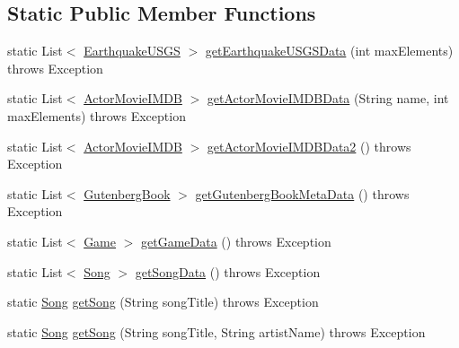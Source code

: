 \subsection*{Static Public Member Functions}
\begin{DoxyCompactItemize}
\item 
static List$<$ \mbox{\hyperlink{classbridges_1_1data__src__dependent_1_1_earthquake_u_s_g_s}{Earthquake\+U\+S\+GS}} $>$ \mbox{\hyperlink{classbridges_1_1connect_1_1_bridges_a58bef23cd12872c6ae5d7358b7485a2b}{get\+Earthquake\+U\+S\+G\+S\+Data}} (int max\+Elements)  throws Exception 
\item 
static List$<$ \mbox{\hyperlink{classbridges_1_1data__src__dependent_1_1_actor_movie_i_m_d_b}{Actor\+Movie\+I\+M\+DB}} $>$ \mbox{\hyperlink{classbridges_1_1connect_1_1_bridges_a242eb7b513790bf285f7996bd7493663}{get\+Actor\+Movie\+I\+M\+D\+B\+Data}} (String name, int max\+Elements)  throws Exception 
\item 
static List$<$ \mbox{\hyperlink{classbridges_1_1data__src__dependent_1_1_actor_movie_i_m_d_b}{Actor\+Movie\+I\+M\+DB}} $>$ \mbox{\hyperlink{classbridges_1_1connect_1_1_bridges_a7a5f5efc6712ead5babe4cd21a4de3cc}{get\+Actor\+Movie\+I\+M\+D\+B\+Data2}} ()  throws Exception 
\item 
static List$<$ \mbox{\hyperlink{classbridges_1_1data__src__dependent_1_1_gutenberg_book}{Gutenberg\+Book}} $>$ \mbox{\hyperlink{classbridges_1_1connect_1_1_bridges_a7847b5a45cae8491acd5b6fb0015415b}{get\+Gutenberg\+Book\+Meta\+Data}} ()  throws Exception 
\item 
static List$<$ \mbox{\hyperlink{classbridges_1_1data__src__dependent_1_1_game}{Game}} $>$ \mbox{\hyperlink{classbridges_1_1connect_1_1_bridges_a594808b9dada5c825ac00ae0c97c9e9b}{get\+Game\+Data}} ()  throws Exception 
\item 
static List$<$ \mbox{\hyperlink{classbridges_1_1data__src__dependent_1_1_song}{Song}} $>$ \mbox{\hyperlink{classbridges_1_1connect_1_1_bridges_a5bcfed7f065d3c9da31e3551bf31ec7c}{get\+Song\+Data}} ()  throws Exception 
\item 
static \mbox{\hyperlink{classbridges_1_1data__src__dependent_1_1_song}{Song}} \mbox{\hyperlink{classbridges_1_1connect_1_1_bridges_a7f65e6648f9e66a02343a39f2fc425cb}{get\+Song}} (String song\+Title)  throws Exception 
\item 
static \mbox{\hyperlink{classbridges_1_1data__src__dependent_1_1_song}{Song}} \mbox{\hyperlink{classbridges_1_1connect_1_1_bridges_ae7621c3cfd9978aa02fe243317cf0cca}{get\+Song}} (String song\+Title, String artist\+Name)  throws Exception 

\end{DoxyCompactItemize}

